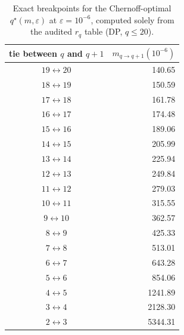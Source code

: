 \begin{table}[H]
\centering
\scriptsize
\setlength{\tabcolsep}{6pt}
\caption{Exact breakpoints for the Chernoff-optimal $q^\star(m,\varepsilon)$ at $\varepsilon=10^{-6}$, computed solely from the audited $r_q$ table (DP, $q\le 20$).}
\label{tab:fold_collision_qstar_breakpoints_eps1e6_q2_20}
\begin{tabular}{c r}
\toprule
tie between $q$ and $q{+}1$ & $m_{q\to q+1}(10^{-6})$\\
\midrule
$19\leftrightarrow 20$ & 140.65\\
$18\leftrightarrow 19$ & 150.59\\
$17\leftrightarrow 18$ & 161.78\\
$16\leftrightarrow 17$ & 174.48\\
$15\leftrightarrow 16$ & 189.06\\
$14\leftrightarrow 15$ & 205.99\\
$13\leftrightarrow 14$ & 225.94\\
$12\leftrightarrow 13$ & 249.84\\
$11\leftrightarrow 12$ & 279.03\\
$10\leftrightarrow 11$ & 315.55\\
$9\leftrightarrow 10$ & 362.57\\
$8\leftrightarrow 9$ & 425.33\\
$7\leftrightarrow 8$ & 513.01\\
$6\leftrightarrow 7$ & 643.28\\
$5\leftrightarrow 6$ & 854.06\\
$4\leftrightarrow 5$ & 1241.89\\
$3\leftrightarrow 4$ & 2128.30\\
$2\leftrightarrow 3$ & 5344.31\\
\bottomrule
\end{tabular}
\end{table}
